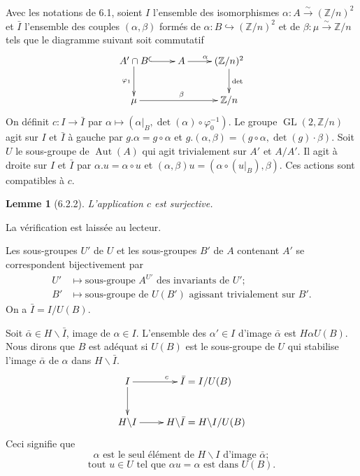 \documentclass[11pt,a4paper]{amsart}
\theoremstyle{plain}
\newtheorem{lemma}[theorem]{Lemme}
\theoremstyle{definition}
\DeclareMathOperator{\Aut}{Aut}
\DeclareMathOperator{\Gl}{GL}
\newcommand{\ZZ}{\mathbb{Z}}
\begin{document}
\subsubsection{}
Avec les notations de 6.1, soient $I$ l'ensemble des isomorphismes $\alpha \colon A \xrightarrow{\sim} (\ZZ/n)^2$ et $\bar{I}$ l'ensemble des couples $(\alpha, \beta)$ form\'es de $\alpha \colon B \hookrightarrow (\ZZ/n)^2$ et de $\beta \colon \mu \xrightarrow{\sim} \ZZ/n$ tels que le diagramme suivant soit commutatif
\[
\xymatrix{
A' \cap B \ar@{^(->}[r] \ar[d]_{\varphi_1} & A \ar[r]^{\alpha} & (\ZZ/n)^2 \ar[d]^{\det} \\
\mu \ar[rr]^{\beta} & & \ZZ/n
}
\]
On d\'efinit $c \colon I \to \bar{I}$ par $\alpha \mapsto (\alpha|_B, \det(\alpha) \circ \varphi_0^{-1})$. Le groupe $\Gl(2, \ZZ/n)$ agit sur $I$ et $\bar{I}$ \`a gauche par $g.\alpha = g \circ \alpha$ et $g.(\alpha, \beta) = (g \circ \alpha, \det(g) \cdot \beta)$. Soit $U$ le sous-groupe de $\Aut(A)$ qui agit trivialement sur $A'$ et $A/A'$. Il agit \`a droite sur $I$ et $\bar{I}$ par $\alpha.u = \alpha \circ u$ et $(\alpha, \beta)u = (\alpha \circ (u|_B), \beta)$. Ces actions sont compatibles \`a $c$.

\begin{lemma}[6.2.2]
L'application $c$ est surjective.
\end{lemma}

La v\'erification est laiss\'ee au lecteur.

Les sous-groupes $U'$ de $U$ et les sous-groupes $B'$ de $A$ contenant $A'$ se correspondent bijectivement par
\begin{align*}
U' & \mapsto \text{sous-groupe } A^{U'} \text{ des invariants de } U'; \\
B' & \mapsto \text{sous-groupe de } U(B') \text{ agissant trivialement sur } B'.
\end{align*}
On a $\bar{I} = I/U(B)$.

Soit $\bar{\alpha} \in H \backslash \bar{I}$, image de $\alpha \in I$. L'ensemble des $\alpha' \in I$ d'image $\bar{\alpha}$ est $H\alpha U(B)$. Nous dirons que $B$ est ad\'equat si $U(B)$ est le sous-groupe de $U$ qui stabilise l'image $\bar{\alpha}$ de $\alpha$ dans $H \backslash \bar{I}$.
\[
\xymatrix{
I \ar[r]^{c} \ar[d] & \bar{I} = I/U(B) \\
H \backslash I \ar[r] & H \backslash \bar{I} = H \backslash I/U(B)
}
\]
Ceci signifie que
\begin{equation}\label{eq:6.2.3}
\alpha \text{ est le seul \'el\'ement de } H \backslash I \text{ d'image } \bar{\alpha};
\end{equation}
\begin{equation}\label{eq:6.2.4}
\text{tout } u \in U \text{ tel que } \alpha u = \alpha \text{ est dans } U(B).
\end{equation}
\end{document}
